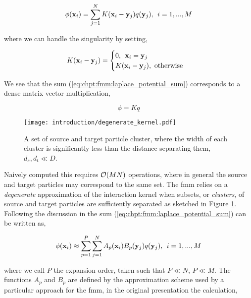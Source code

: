 \begin{equation}
    \phi(\mathbf{x}_i) = \sum_{j=1}^N K(\mathbf{x}_i-\mathbf{y}_j)q(\mathbf{y}_j), \> \> i = 1,...,M
    \label{eq:chpt:fmm:laplace_potential_sum}
\end{equation}

where we can handle the singularity by setting,

\begin{equation}
    K(\mathbf{x}_i - \mathbf{y}_j) = \begin{cases}
        0, \> \> \mathbf{x}_i = \mathbf{y}_j \\
        K(\mathbf{x}_i - \mathbf{y}_j), \text{  otherwise}
    \end{cases}
\end{equation}


We see that the sum (\ref{eq:chpt:fmm:laplace_potential_sum}) corresponds to a dense matrix vector multiplication,

\begin{equation}
    \phi = K q
\end{equation}

\begin{figure}
    \centering
    \texttt{[image: introduction/degenerate\_kernel.pdf]}
    \caption{A set of source and target particle cluster, where the width of each cluster is significantly less than the distance separating them, $d_s, d_t \ll D$.}
    \label{fig:chpt:fmm:degenerate_kernel}
\end{figure}

Naively computed this requires $\mathcal{O}(MN)$ operations, where in general the source and target particles may correspond to the same set. The \acrshort{fmm} relies on a \textit{degenerate} approximation of the interaction kernel when subsets, or \textit{clusters}, of source and target particles are sufficiently separated as sketched in Figure \ref{fig:chpt:fmm:degenerate_kernel}. Following the discussion in \cite{kailasa2024m2ltranslationoperatorskernel} the sum (\ref{eq:chpt:fmm:laplace_potential_sum}) can be written as,

\begin{equation}
    \phi(\mathbf{x}_i) \approx \sum_{p=1}^P \sum_{j=1}^N A_p(\mathbf{x}_i) B_p(\mathbf{y}_j)q(\mathbf{y}_j), \> \> i = 1,...,M
    \label{eq:chpt:fmm:degenerate_kernel}
\end{equation}

where we call $P$ the expansion order, taken such that $P \ll N$, $P \ll M$. The functions $A_p$ and $B_p$ are defined by the approximation scheme used by a particular approach for the \acrshort{fmm}, in the original presentation the calculation,

